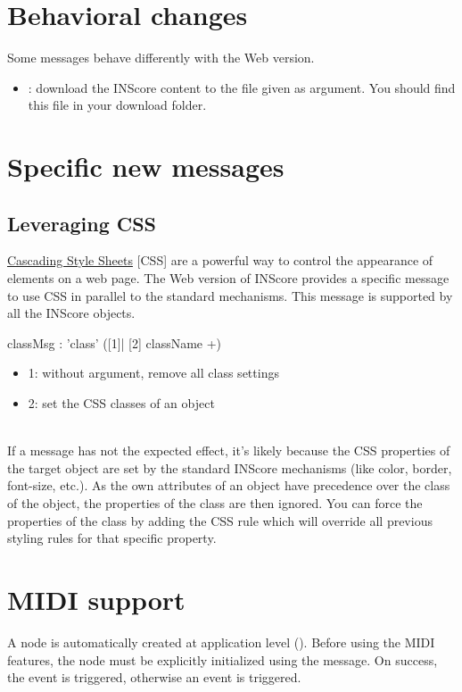 \documentclass[a4paper,twoside]{article}
\newcommand{\toplevel}[1]	{\section{#1}}
\newcommand{\sublevel}[1]	{\subsection{#1}}
\begin{document}
\toplevel{Behavioral changes}
\label{behavior}

Some messages behave differently with the Web version.
\begin{itemize}
\item {}: download the INScore content to the file given as argument. You should find this file in your download folder.
\end{itemize}


\toplevel{Specific new messages}
\label{newMessages}

\sublevel{Leveraging CSS}
\label{webCSS}

\href{https://www.w3schools.com/css/css_intro.asp}{Cascading Style Sheets} [CSS] are a powerful way to control the appearance of elements on a web page. The Web version of INScore provides a specific  message to use CSS in parallel to the standard mechanisms. This message is supported by all the INScore objects. 

\begin{rail}
classMsg : 'class' ([1]| [2] className +)
\end{rail}

\begin{itemize}
\item 1: without argument, remove all class settings
\item 2: set the CSS classes of an object
\end{itemize}

\note{}\\
If a  message has not the expected effect, it's likely because the CSS properties of the target object are set by the standard INScore mechanisms (like color, border, font-size, etc.). As the own attributes of an object have precedence over the class of the object, the properties of the class are then ignored. You can force the properties of the class by adding the CSS rule  which will override all previous styling rules for that specific property.

\toplevel{MIDI support}
\label{MIDI}

A  node is automatically created at application level ().
Before using the MIDI features, the  node must be explicitly initialized using the  message. On success, the  event is triggered, otherwise an  event is triggered.
\end{document}
